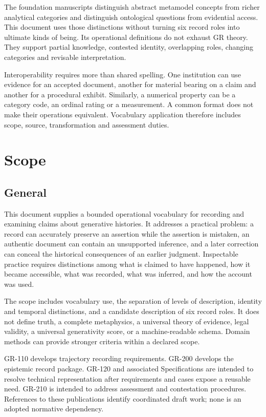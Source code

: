 \documentclass[11pt,a4paper]{article}
\begin{document}
The foundation manuscripts distinguish abstract metamodel concepts from richer analytical categories and distinguish ontological questions from evidential access. This document uses those distinctions without turning six record roles into ultimate kinds of being. Its operational definitions do not exhaust GR theory. They support partial knowledge, contested identity, overlapping roles, changing categories and revisable interpretation.

Interoperability requires more than shared spelling. One institution can use evidence for an accepted document, another for material bearing on a claim and another for a procedural exhibit. Similarly, a numerical property can be a category code, an ordinal rating or a measurement. A common format does not make their operations equivalent. Vocabulary application therefore includes scope, source, transformation and assessment duties.

\GSPmainmatter
\section{Scope}
\subsection{General}

This document supplies a bounded operational vocabulary for recording and examining claims about generative histories. It addresses a practical problem: a record can accurately preserve an assertion while the assertion is mistaken, an authentic document can contain an unsupported inference, and a later correction can conceal the historical consequences of an earlier judgment. Inspectable practice requires distinctions among what is claimed to have happened, how it became accessible, what was recorded, what was inferred, and how the account was used.

The scope includes vocabulary use, the separation of levels of description, identity and temporal distinctions, and a candidate description of six record roles. It does not define truth, a complete metaphysics, a universal theory of evidence, legal validity, a universal generativity score, or a machine-readable schema. Domain methods can provide stronger criteria within a declared scope.

GR-110 develops trajectory recording requirements. GR-200 develops the epistemic record package. GR-120 and associated Specifications are intended to resolve technical representation after requirements and cases expose a reusable need. GR-210 is intended to address assessment and contestation procedures. References to these publications identify coordinated draft work; none is an adopted normative dependency.
\end{document}
